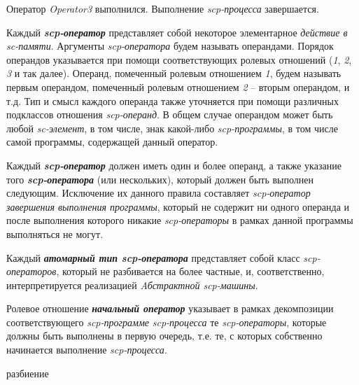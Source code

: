 Оператор \textit{Operator3} выполнился. Выполнение \textit{scp-процесса} завершается.

\begin{SCn}
\end{SCn}

Каждый \textbf{\textit{scp-оператор}} представляет собой некоторое элементарное \textit{действие в sc-памяти}. Аргументы \textit{scp-оператора} будем называть операндами. Порядок операндов указывается при помощи соответствующих ролевых отношений (\textit{1\scnrolesign}, \textit{2\scnrolesign}, \textit{3\scnrolesign} и так далее). Операнд, помеченный ролевым отношением \textit{1\scnrolesign}, будем называть первым операндом, помеченный ролевым отношением \textit{2\scnrolesign} – вторым операндом, и т.д. Тип и смысл каждого операнда также уточняется при помощи различных подклассов отношения \textit{scp-операнд\scnrolesign}. В общем случае операндом может быть любой \textit{sc-элемент}, в том числе, знак какой-либо \textit{scp-программы}, в том числе самой программы, содержащей данный оператор.

Каждый \textbf{\textit{scp-оператор}} должен иметь один и более операнд, а также указание того \textbf{\textit{scp-оператора}} (или нескольких), который должен быть выполнен следующим. Исключение их данного правила составляет \textit{scp-оператор завершения выполнения программы}, который не содержит ни одного операнда и после выполнения которого никакие \textit{scp-операторы} в рамках данной программы выполняться не могут.

Каждый \textbf{\textit{атомарный тип scp-оператора}} представляет собой класс \textit{scp-операторов}, который не разбивается на более частные, и, соответственно, интерпретируется реализацией \textit{Aбстрактной scp-машины}.

\begin{SCn}
\scnsubset{1\scnrolesign}
\end{SCn}

Ролевое отношение \textbf{\textit{начальный оператор\scnrolesign}} указывает в рамках декомпозиции соответствующего \textit{\mbox{scp-программе}} \textit{scp-процесса} те \textit{scp-операторы}, которые должны быть выполнены в первую очередь, т.е. те, с которых собственно начинается выполнение \textit{scp-процесса}.

\begin{SCn}
\begin{scnrelfromset}{разбиение}
\end{scnrelfromset}
\end{SCn}

